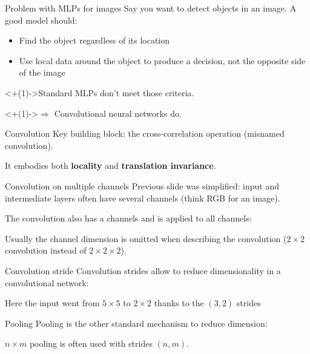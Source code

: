 \begin{frame}{Problem with MLPs for images}
  Say you want to detect objects in an image. A good model should:
  \begin{itemize}[<+(1)->]
    \item Find the object regardless of its location
    \item Use local data around the object to produce a decision, not the opposite side of the image
  \end{itemize}

  \onslide<+(1)->{Standard MLPs don't meet those criteria.}

  \onslide<+(1)->{$\Rightarrow$ Convolutional neural networks do.}
\end{frame}

\begin{frame}{Convolution}
  Key building block: the cross-correlation operation (misnamed convolution).

  It embodies both \textbf{locality} and \textbf{translation invariance}.

\end{frame}

\begin{frame}{Convolution on multiple channels}
  Previous slide was simplified: input and intermediate layers often have several channels (think RGB for an image).

  The convolution also has a channels and is applied to all channels:


  Usually the channel dimension is omitted when describing the convolution ($2 \times 2$ convolution instead of $2 \times 2 \times 2$).
\end{frame}

\begin{frame}{Convolution stride}
  Convolution strides allow to reduce dimensionality in a convolutional network:


  Here the input went from $5 \times 5$ to $2 \times 2$ thanks to the $(3, 2)$ strides
\end{frame}

\begin{frame}{Pooling}
  Pooling is the other standard mechanism to reduce dimension:


  $n \times m$ pooling is often used with strides $(n, m)$.
\end{frame}

